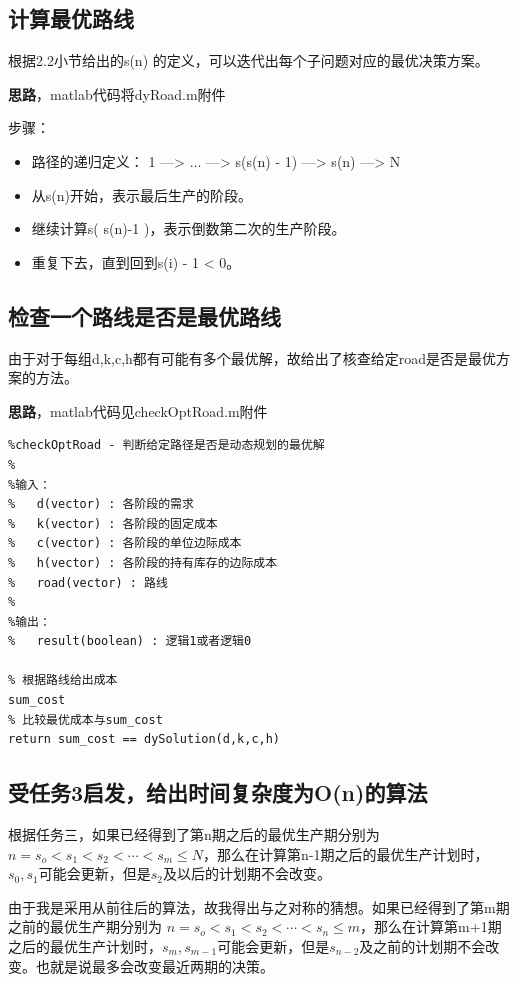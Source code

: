 \documentclass[UTF8]{ctexart}
\begin{document}
\subsection{计算最优路线}
根据2.2小节给出的s(n) 的定义，可以迭代出每个子问题对应的最优决策方案。

\textbf{思路}，matlab代码将dyRoad.m附件

步骤：
\begin{itemize}
    \item 路径的递归定义： 1 ---> ... ---> s(s(n) - 1) --->  s(n) ---> N 
    \item 从s(n)开始，表示最后生产的阶段。
    \item 继续计算s( s(n)-1 )，表示倒数第二次的生产阶段。
    \item 重复下去，直到回到s(i) - 1 < 0。 
\end{itemize}

\subsection{检查一个路线是否是最优路线}
由于对于每组d,k,c,h都有可能有多个最优解，故给出了核查给定road是否是最优方案的方法。

\textbf{思路}，matlab代码见checkOptRoad.m附件
\begin{lstlisting}
%checkOptRoad - 判断给定路径是否是动态规划的最优解
%
%输入：
%   d(vector) : 各阶段的需求
%   k(vector) : 各阶段的固定成本
%   c(vector) : 各阶段的单位边际成本
%   h(vector) : 各阶段的持有库存的边际成本
%   road(vector) : 路线
%
%输出：
%   result(boolean) : 逻辑1或者逻辑0

% 根据路线给出成本
sum_cost
% 比较最优成本与sum_cost
return sum_cost == dySolution(d,k,c,h)
\end{lstlisting}

\subsection{受任务3启发，给出时间复杂度为O(n)的算法}
根据任务三，如果已经得到了第n期之后的最优生产期分别为 \( n=s_o < s_1 < s_2 < \cdots < s_m \leq N \)，那么在计算第n-1期之后的最优生产计划时，\( s_0,s_1 \)可能会更新，但是\( s_2 \)及以后的计划期不会改变。

由于我是采用从前往后的算法，故我得出与之对称的猜想。如果已经得到了第m期之前的最优生产期分别为 \( n=s_o < s_1 < s_2 < \cdots < s_n \leq m \)，那么在计算第m+1期之后的最优生产计划时，\( s_m,s_{m-1} \)可能会更新，但是\( s_{n-2} \)及之前的计划期不会改变。也就是说最多会改变最近两期的决策。
\end{document}
